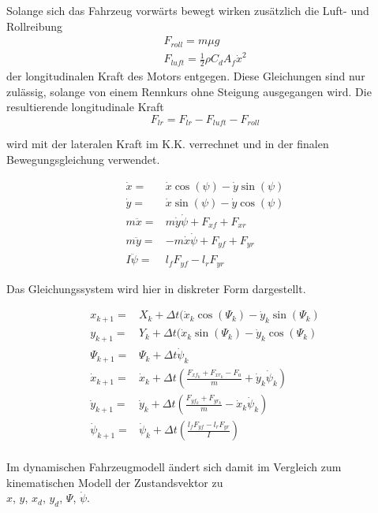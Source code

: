 \documentclass{like}
\begin{document}
Solange sich das Fahrzeug vorwärts bewegt wirken zusätzlich die Luft- und Rollreibung 
\begin{eqnarray}
F_{roll} = m \mu g \\
F_{luft} = \frac{1}{2} \rho C_d A_f \dot{x}^2
\end{eqnarray}
der longitudinalen Kraft des Motors entgegen.
Diese Gleichungen sind nur zulässig, solange von einem Rennkurs ohne Steigung ausgegangen wird. Die resultierende longitudinale Kraft 
\begin{equation}
F_{lr} = F_{lr} - F_{luft} - F_{roll}
\end{equation}

wird mit der lateralen Kraft im \ac{K.K.} verrechnet und in der finalen Bewegungsgleichung verwendet.

\begin{eqnarray}
\dot{x} =& \dot{x} \cos(\psi) - \dot{y} \sin(\psi) \\
\dot{y} =& \dot{x} \sin(\psi) - \dot{y} \cos(\psi) \\
m \ddot{x} =& m \dot{y} \dot{\psi} + F_{xf} +  F_{xr}\\
m \ddot{y} =& - m \dot{x} \dot{\psi} +  F_{yf} +  F_{yr} \\
I \ddot{\psi} =&  l_f F_{yf} -  l_r F_{yr} 
\end{eqnarray}

Das Gleichungssystem wird hier in diskreter Form dargestellt.

\begin{eqnarray}
x_{k+1} =& X_k + \Delta t(\dot{x}_k \cos(\Psi_k) - \dot{y}_k \sin(\Psi_k) \\
y_{k+1} =& Y_{k} + \Delta t(\dot{x}_k \sin(\Psi_k) - \dot{y}_k \cos(\Psi_k) \\
\Psi_{k+1} =& \Psi_k + \Delta t \dot{\psi}_k \\
\dot{x}_{k+1} =&  \dot{x}_k + \Delta t \left(\frac{F_{xf_k} +  F_{xr_k}- F_a}{m} + \dot{y}_k \dot{\psi}_k \right) \\
\dot{y}_{k+1} =&  \dot{y}_k + \Delta t \left(\frac{ F_{yf_k} +  F_{yr_k}}{m} - \dot{x}_k \dot{\psi}_k \right)  \\
\dot{\psi}_{k+1} =& \dot{\psi}_k + \Delta t \left( \frac{ l_f F_{yf} -  l_r F_{yr}}{I}  \right)\\
\end{eqnarray}

Im dynamischen Fahrzeugmodell ändert sich damit im Vergleich zum kinematischen Modell der Zustandsvektor zu\\
\(x\), \(y\), \(x_d\), \(y_d\), \(\Psi\), \(\dot{\psi}\). \\
\end{document}
